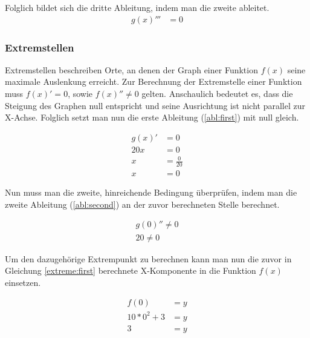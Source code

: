 \documentclass[a4paper]{article}
\begin{document}
				Folglich bildet sich die dritte Ableitung, indem man die zweite ableitet.
				\begin{equation}
					\begin{split}
						g(x)''' &= 0
					\end{split}
				\end{equation}
				
			\subsubsection{Extremstellen}
				Extremstellen beschreiben Orte, an denen der Graph einer Funktion $f(x)$ seine maximale Auslenkung erreicht. Zur Berechnung der Extremstelle einer Funktion muss $f(x)' = 0$, sowie $f(x)'' \neq 0$ gelten. Anschaulich bedeutet es, dass die Steigung des Graphen null entspricht und seine Ausrichtung ist nicht parallel zur X-Achse.
				Folglich setzt man nun die erste Ableitung (\ref{abl:first}) mit null gleich.
				
				\begin{equation}
					\begin{split}
						g(x)' &= 0\\
						20x &= 0\\
						x &= \frac{0}{20}\\
						x &= 0\label{extreme:first}
					\end{split}
				\end{equation}
				
				Nun muss man die zweite, hinreichende Bedingung überprüfen, indem man die zweite Ableitung (\ref{abl:second}) an der zuvor berechneten Stelle berechnet.
				
				\begin{equation}
					\begin{split}
						g(0)'' \neq 0\\
						20 \neq 0
					\end{split}
				\end{equation}
				
				Um den dazugehörige Extrempunkt zu berechnen kann man nun die zuvor in Gleichung \ref{extreme:first} berechnete X-Komponente in die Funktion $f(x)$ einsetzen.
				
				\begin{equation}
					\begin{split}
						f(0) &= y\\
						10 * 0^2 + 3 &= y\\
						3 &= y
					\end{split}
				\end{equation}
				
\end{document}
